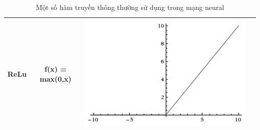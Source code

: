 \begin{table}[!htp]
\begin{tabular}{|c|c|c|c|}
		\hline		
		ReLu & f(x) = max(0,x) & \includegraphics[scale=.3]{r} \\
		\hline
     \end{tabular}
    \caption{Một số hàm truyền thông thường sử dụng trong mạng neural}
    \label{bang1}
\end{table}

